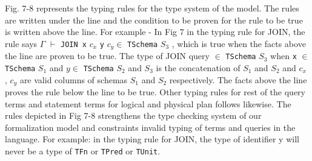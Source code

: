 Fig. 7-8 represents the typing rules for the type system of the model. The rules are written under the line and the condition to be proven for the rule to be true is written above the line. For example - In Fig 7 in the typing rule for JOIN, the rule says \newline $\Gamma$ $\vdash$ \texttt{JOIN \:x} \:$c_x$ \texttt{\:y} \:$c_y \in$ \texttt{TSchema} \:$S_3$ ,\: which is true when the facts above the line are proven to be true. The type of JOIN query $\in$ \texttt{TSchema} \:$S_3$ when \texttt{x} $\in$ \: \texttt{TSchema} \:$S_1$ and $y \in$ \: \texttt{TSchema} \:$S_2$ and $S_3$ is the concatenation of $S_1$ and $S_2$ and $c_x$ , $c_y$ are valid columns of schemas $S_1$ and $S_2$ respectively. The facts above the line proves the rule below the line to be true. Other typing rules for rest of the query terms and statement terms for logical and physical plan follows likewise.
The rules depicted in Fig 7-8 strengthens the type checking system of our formalization model and constraints invalid typing of terms and queries in the language. For example: in the typing rule for JOIN, the type of identifier y will never be a type of \texttt{TFn} or \texttt{TPred} or \texttt{TUnit}.  
